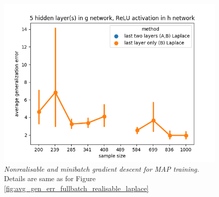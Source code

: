 \documentclass{article} %
\begin{document}
\begin{figure}[t!]
\begin{center}
		\includegraphics[scale=0.35]{laplace_taskid7.png}
	\end{center}
	\caption{\textit{Nonrealisable and minibatch gradient descent for MAP training.} Details are same as for Figure \ref{fig:avg_gen_err_fullbatch_realisable_laplace}
	}
	\label{fig:avg_gen_err_minibatch_nonrealisable_laplace}
\end{figure}
\end{document}

